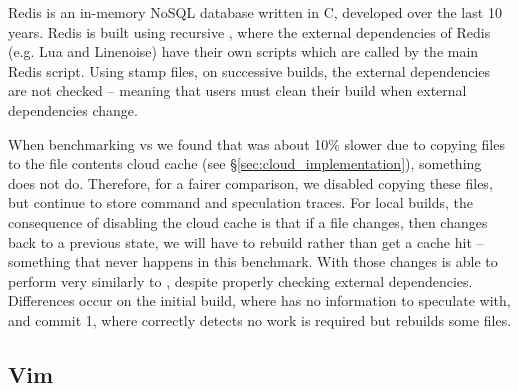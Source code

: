 
Redis is an in-memory NoSQL database written in C, developed over the last 10 years. Redis is built using recursive \Make \cite{miller:recursive_make}, where the external dependencies of Redis (e.g. Lua and Linenoise) have their own \Make scripts which are called by the main Redis \Make script. Using stamp files, on successive builds, the external dependencies are not checked -- meaning that users must clean their build when external dependencies change.

When benchmarking \Rattle vs \Make we found that \Rattle was about 10\% slower due to copying files to the file contents cloud cache (see \S\ref{sec:cloud_implementation}), something \Make does not do. Therefore, for a fairer comparison, we disabled copying these files, but continue to store command and speculation traces. For local builds, the consequence of disabling the cloud cache is that if a file changes, then changes back to a previous state, we will have to rebuild rather than get a cache hit -- something that never happens in this benchmark. With those changes \Rattle is able to perform very similarly to \Make, despite properly checking external dependencies. Differences occur on the initial build, where \Rattle has no information to speculate with, and commit 1, where \Rattle correctly detects no work is required but \Make rebuilds some files.

\subsection{Vim}
\label{sec:eval:vim}

